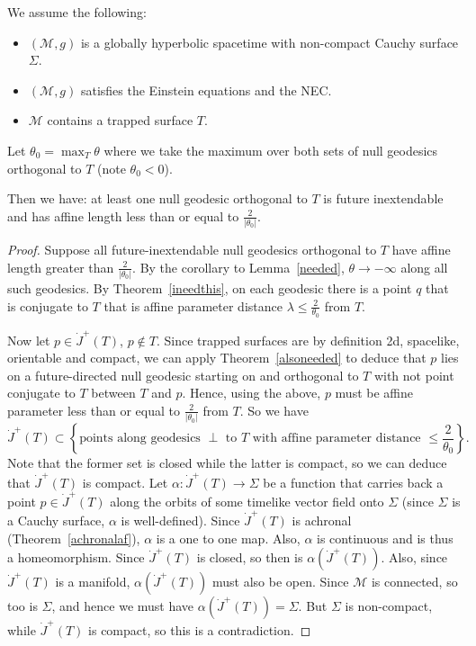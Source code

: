 \documentclass{jknotes}
\begin{document}
\begin{theorem}
    We assume the following:
    \begin{itemize}
        \item \((\mathcal{M},g)\) is a globally hyperbolic spacetime with non-compact Cauchy surface \(\Sigma\).
        \item \((\mathcal{M},g)\) satisfies the Einstein equations and the NEC.
        \item \(\mathcal{M}\) contains a trapped surface \(T\).
    \end{itemize}
    Let \(\theta_0 = \max_T\theta\) where we take the maximum over both sets of null geodesics orthogonal to \(T\) (note \(\theta_0 < 0\)).
    
    Then we have: at least one null geodesic orthogonal to \(T\) is future inextendable and has affine length less than or equal to \(\frac{2}{|\theta_0|}\).
\end{theorem}
\begin{proof}
    Suppose all future-inextendable null geodesics orthogonal to \(T\) have affine length greater than \(\frac{2}{|\theta_0|}\). By the corollary to Lemma~\ref{needed}, \(\theta \to -\infty\) along all such geodesics. By Theorem~\ref{ineedthis}, on each geodesic there is a point \(q\) that is conjugate to \(T\) that is affine parameter distance \(\lambda \le \frac{2}{\theta_0}\) from \(T\).

    Now let \(p \in \dot{J}^+(T)\), \(p \not\in T\). Since trapped surfaces are by definition 2d, spacelike, orientable and compact, we can apply Theorem~\ref{alsoneeded} to deduce that \(p\) lies on a future-directed null geodesic starting on and orthogonal to \(T\) with not point conjugate to \(T\) between \(T\) and \(p\). Hence, using the above, \(p\) must be affine parameter less than or equal to \(\frac{2}{|\theta_0|}\) from \(T\). So we have
    \begin{equation}
        \dot{J}^+(T) \subset \left\{\text{points along geodesics \(\perp\) to \(T\) with affine parameter distance \(\le \frac{2}{\theta_0}\)}\right\}.
    \end{equation}
    Note that the former set is closed while the latter is compact, so we can deduce that \(\dot{J}^+(T)\) is compact. Let \(\alpha:\dot{J}^+(T)\to\Sigma\) be a function that carries back a point \(p \in \dot{J}^+(T)\) along the orbits of some timelike vector field onto \(\Sigma\) (since \(\Sigma\) is a Cauchy surface, \(\alpha\) is well-defined). Since \(\dot{J}^+(T)\) is achronal (Theorem~\ref{achronalaf}), \(\alpha\) is a one to one map. Also, \(\alpha\) is continuous and is thus a homeomorphism. Since \(\dot{J}^+(T)\) is closed, so then is \(\alpha(\dot{J}^+(T))\). Also, since \(\dot{J}^+(T)\) is a manifold, \(\alpha(\dot{J}^+(T))\) must also be open. Since \(\mathcal{M}\) is connected, so too is \(\Sigma\), and hence we must have \(\alpha(\dot{J}^+(T)) = \Sigma\). But \(\Sigma\) is non-compact, while \(\dot{J}^+(T)\) is compact, so this is a contradiction.
\end{proof}
\end{document}
